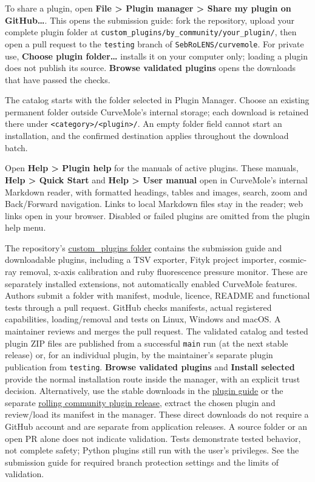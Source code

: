 \documentclass[
  10pt,
  a4paper,
  oneside]{scrreprt}
\begin{document}
To share a plugin, open \textbf{File \textgreater{} Plugin manager
\textgreater{} Share my plugin on GitHub\ldots{}}. This opens the
submission guide: fork the repository, upload your complete plugin
folder at \texttt{custom\_plugins/by\_community/your\_plugin/}, then
open a pull request to the \texttt{testing} branch of
\texttt{SebRoLENS/curvemole}. For private use, \textbf{Choose plugin
folder\ldots{}} installs it on your computer only; loading a plugin does
not publish its source. \textbf{Browse validated plugins} opens the
downloads that have passed the checks.

The catalog starts with the folder selected in Plugin Manager. Choose an
existing permanent folder outside CurveMole's internal storage; each
download is retained there under
\texttt{\textless{}category\textgreater{}/\textless{}plugin\textgreater{}/}.
An empty folder field cannot start an installation, and the confirmed
destination applies throughout the download batch.

Open \textbf{Help \textgreater{} Plugin help} for the manuals of active
plugins. These manuals, \textbf{Help \textgreater{} Quick Start} and
\textbf{Help \textgreater{} User manual} open in CurveMole's internal
Markdown reader, with formatted headings, tables and images, search,
zoom and Back/Forward navigation. Links to local Markdown files stay in
the reader; web links open in your browser. Disabled or failed plugins
are omitted from the plugin help menu.

The repository's \href{../custom_plugins/README.md}{custom\_plugins
folder} contains the submission guide and downloadable plugins,
including a TSV exporter, Fityk project importer, cosmic-ray removal,
x-axis calibration and ruby fluorescence pressure monitor. These are
separately installed extensions, not automatically enabled CurveMole
features. Authors submit a folder with manifest, module, licence, README
and functional tests through a pull request. GitHub checks manifests,
actual registered capabilities, loading/removal and tests on Linux,
Windows and macOS. A maintainer reviews and merges the pull request. The
validated catalog and tested plugin ZIP files are published from a
successful \texttt{main} run (at the next stable release) or, for an
individual plugin, by the maintainer's separate plugin publication from
\texttt{testing}. \textbf{Browse validated plugins} and \textbf{Install
selected} provide the normal installation route inside the manager, with
an explicit trust decision. Alternatively, use the stable downloads in
the \href{../custom_plugins/README.md}{plugin guide} or the separate
\href{https://github.com/SebRoLENS/curvemole/releases/tag/community-plugins-latest}{rolling
community plugin release}, extract the chosen plugin and review/load its
manifest in the manager. These direct downloads do not require a GitHub
account and are separate from application releases. A source folder or
an open PR alone does not indicate validation. Tests demonstrate tested
behavior, not complete safety; Python plugins still run with the user's
privileges. See the submission guide for required branch protection
settings and the limits of validation.
\end{document}
